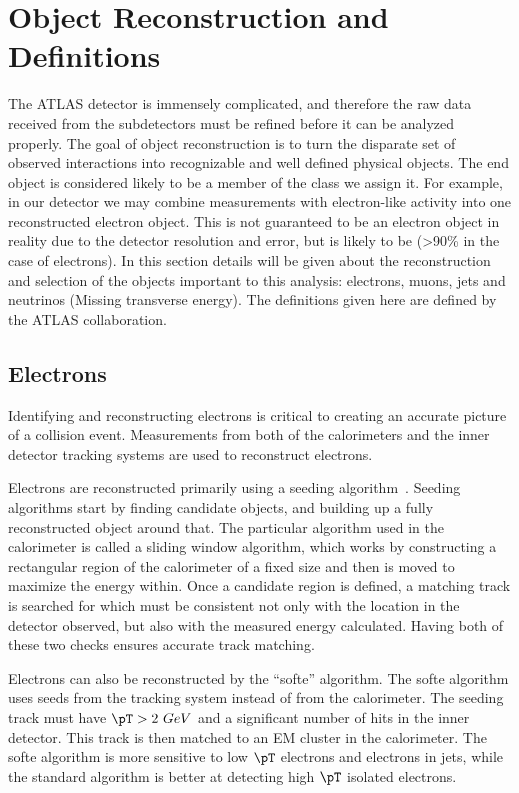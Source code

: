 \chapter{Object Reconstruction and Definitions}
\label{SECTION-OBJDEF}
The ATLAS detector is immensely complicated, and therefore the raw data received from the subdetectors must be refined before it can be analyzed properly. The goal of object reconstruction is to turn the disparate set of observed interactions into recognizable and well defined physical objects. The end object is considered likely to be a member of the class we assign it. For example, in our detector we may combine measurements with electron-like activity into one reconstructed electron object. This is not guaranteed to be an electron object in reality due to the detector resolution and error, but is likely to be (>90\% in the case of electrons). In this section details will be given about the reconstruction and selection of the objects important to this analysis: electrons, muons, jets and neutrinos (Missing transverse energy). The definitions given here are defined by the ATLAS collaboration. 

\section{Electrons}
\label{SECTION-DEFINEELECTRONS}
Identifying and reconstructing electrons is critical to creating an accurate picture of a collision event. Measurements from both of the calorimeters and the inner detector tracking systems are used to reconstruct electrons. 

Electrons are reconstructed primarily using a seeding algorithm~\cite{ELECTRON-RECO}. Seeding algorithms start by finding candidate objects, and building up a fully reconstructed object around that. The particular algorithm used in the calorimeter is called a sliding window algorithm, which works by constructing a rectangular region of the calorimeter of a fixed size and then is moved to maximize the energy within. Once a candidate region is defined, a matching track is searched for which must be consistent not only with the location in the detector observed, but also with the measured energy calculated. Having both of these two checks ensures accurate track matching. 

Electrons can also be reconstructed by the ``softe'' algorithm. The softe algorithm uses seeds from the tracking system instead of from the calorimeter. The seeding track must have $\pT > 2\ GeV$ and a significant number of hits in the inner detector. This track is then matched to an EM cluster in the calorimeter. The softe algorithm is more sensitive to low $\pT$ electrons and electrons in jets, while the standard algorithm is better at detecting high $\pT$ isolated electrons. 

